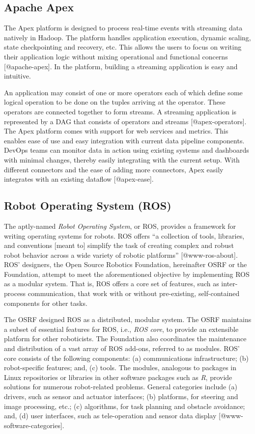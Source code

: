 \subsection{Apache Apex}

The Apex platform is designed to process real-time events with
streaming data natively in Hadoop. The platform handles application
execution, dynamic scaling, state checkpointing and recovery,
etc. This allows the users to focus on writing their application logic
without mixing operational and functional
concerns [@apache-apex]. In the platform, building a streaming
application is easy and intuitive.

An application may consist of one or more operators each of which
define some logical operation to be done on the tuples arriving at the
operator. These operators are connected together to form streams. A
streaming application is represented by a DAG that consists of
operators and streams [@apex-operators]. The Apex platform comes
with support for web services and metrics. This enables ease of use
and easy integration with current data pipeline components. DevOps
teams can monitor data in action using existing systems and dashboards
with minimal changes, thereby easily integrating with the current
setup. With different connectors and the ease of adding more
connectors, Apex easily integrates with an existing
dataflow [@apex-ease].

\subsection{Robot Operating System (ROS)}

The aptly-named \textit{Robot Operating System}, or ROS, provides a framework
for writing operating systems for robots.  ROS offers ``a collection
of tools, libraries, and conventions [meant to] simplify the task of
creating complex and robust robot behavior across a wide variety of
robotic platforms'' [@www-ros-about]. ROS' designers, the Open
Source Robotics Foundation, hereinafter OSRF or the Foundation,
attempt to meet the aforementioned objective by implementing ROS as a
modular system.  That is, ROS offers a core set of features, such as
inter-process communication, that work with or without pre-existing,
self-contained components for other tasks.

The OSRF designed ROS as a distributed, modular system.  The OSRF
maintains a subset of essential features for ROS, i.e., \textit{ROS core}, to
provide an extensible platform for other roboticists.  The Foundation
also coordinates the maintenance and distribution of a vast array of
ROS add-ons, referred to as modules.  ROS' core consists of the
following components: (a) communications infrastructure; (b)
robot-specific features; and, (c) tools.  The modules, analogous to
packages in Linux repositories or libraries in other software packages
such as \textit{R}, provide solutions for numerous robot-related problems.
General categories include (a) drivers, such as sensor and actuator
interfaces; (b) platforms, for steering and image processing, etc.;
(c) algorithms, for task planning and obstacle avoidance; and, (d)
user interfaces, such as tele-operation and sensor data
display [@www-software-categories].


